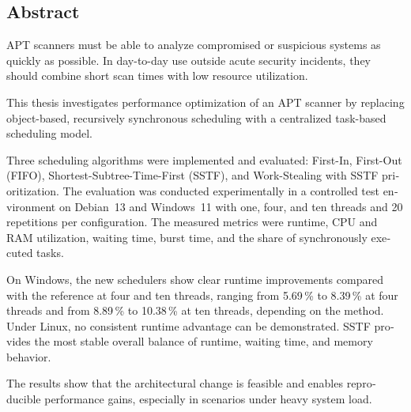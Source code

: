 

\begin{otherlanguage}{american}
	\chapter*{Abstract}

	\begin{sloppypar}
	\noindent \acs{APT} scanners must be able to analyze compromised or suspicious systems as quickly as possible. In day-to-day use outside acute security incidents, they should combine short scan times with low resource utilization.

	\vspace{7.56mm}

	\noindent This thesis investigates performance optimization of an \acs{APT} scanner by replacing object-based, recursively synchronous scheduling with a centralized task-based scheduling model.

	\vspace{7.56mm}

	\noindent Three scheduling algorithms were implemented and evaluated: First-In, First-Out (\acs{FIFO}), Shortest-Subtree-Time-First (\acs{SSTF}), and Work-Stealing with \acs{SSTF} prioritization. The evaluation was conducted experimentally in a controlled test environment on Debian~13 and Windows~11 with one, four, and ten threads and 20 repetitions per configuration. The measured metrics were runtime, \acs{CPU} and \acs{RAM} utilization, waiting time, burst time, and the share of synchronously executed tasks.

	\vspace{7.56mm}

	\noindent On Windows, the new schedulers show clear runtime improvements compared with the reference at four and ten threads, ranging from 5.69\,\% to 8.39\,\% at four threads and from 8.89\,\% to 10.38\,\% at ten threads, depending on the method. Under Linux, no consistent runtime advantage can be demonstrated. \acs{SSTF} provides the most stable overall balance of runtime, waiting time, and memory behavior.

	\vspace{7.56mm}

	\noindent The results show that the architectural change is feasible and enables reproducible performance gains, especially in scenarios under heavy system load.
	\end{sloppypar}

\end{otherlanguage}
